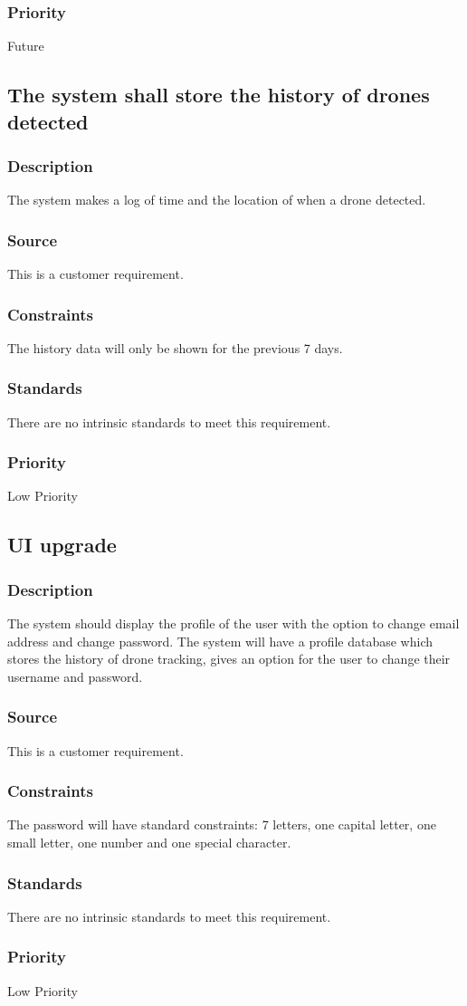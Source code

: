 \subsubsection{Priority}
Future

\subsection{The system shall store the history of drones detected}
\subsubsection{Description}
The system makes a log of time and the location of when a drone detected.
\subsubsection{Source}
This is a customer requirement.
\subsubsection{Constraints}
The history data will only be shown for the previous 7 days.
\subsubsection{Standards}
There are no intrinsic standards to meet this requirement.
\subsubsection{Priority}
Low Priority

\subsection{UI upgrade}
\subsubsection{Description}
The system should display the profile of the user with the option to change email address and change password. The system will have a profile database which stores the history of drone tracking, gives an option for the user to change their username and password.
\subsubsection{Source}
This is a customer requirement.
\subsubsection{Constraints}
The password will have standard constraints: 7 letters, one capital letter, one small letter, one number and one special character.
\subsubsection{Standards}
There are no intrinsic standards to meet this requirement.
\subsubsection{Priority}
Low Priority
